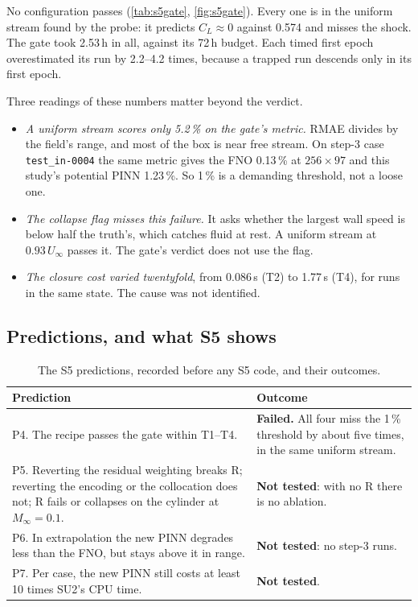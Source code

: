 \documentclass[11pt]{article}
\newcommand{\Ma}{M_\infty}
\newcommand{\CL}{C_L}
\begin{document}
No configuration passes (\cref{tab:s5gate}, \cref{fig:s5gate}). Every one is in the uniform stream
found by the probe: it predicts $\CL\approx0$ against 0.574 and misses the shock. The gate took
2.53\,h in all, against its 72\,h budget. Each timed first epoch overestimated its run by 2.2--4.2
times, because a trapped run descends only in its first epoch.

Three readings of these numbers matter beyond the verdict.
\begin{itemize}
  \item \emph{A uniform stream scores only 5.2\,\% on the gate's metric.} RMAE divides by the
    field's range, and most of the box is near free stream. On step-3 case
    \texttt{test\_in-0004} the same metric gives the FNO 0.13\,\% at $256\times97$ and this
    study's potential PINN 1.23\,\%. So 1\,\% is a demanding threshold, not a loose one.
  \item \emph{The collapse flag misses this failure.} It asks whether the largest wall speed is
    below half the truth's, which catches fluid at rest. A uniform stream at $0.93\,U_\infty$ passes
    it. The gate's verdict does not use the flag.
  \item \emph{The closure cost varied twentyfold}, from 0.086\,s (T2) to 1.77\,s (T4), for runs in
    the same state. The cause was not identified.
\end{itemize}

\subsection{Predictions, and what S5 shows}
\label{sec:s5outcome}

\begin{table}[t]
\centering\small
\caption{The S5 predictions, recorded before any S5 code, and their outcomes.}
\label{tab:s5predictions}
\begin{tabularx}{\textwidth}{@{}>{\raggedright\arraybackslash}p{}>{\raggedright\arraybackslash}X@{}}
\toprule
Prediction & Outcome\\
\midrule
P4. The recipe passes the gate within T1--T4. & \textbf{Failed.} All four miss the 1\,\%
threshold by about five times, in the same uniform stream.\\
\addlinespace
P5. Reverting the residual weighting breaks R; reverting the encoding or the collocation does not;
R fails or collapses on the cylinder at $\Ma = 0.1$. & \textbf{Not tested}: with no R there is no
ablation.\\
\addlinespace
P6. In extrapolation the new PINN degrades less than the FNO, but stays above it in range. &
\textbf{Not tested}: no step-3 runs.\\
\addlinespace
P7. Per case, the new PINN still costs at least 10 times SU2's CPU time. & \textbf{Not tested}.\\
\bottomrule
\end{tabularx}
\end{table}
\end{document}
